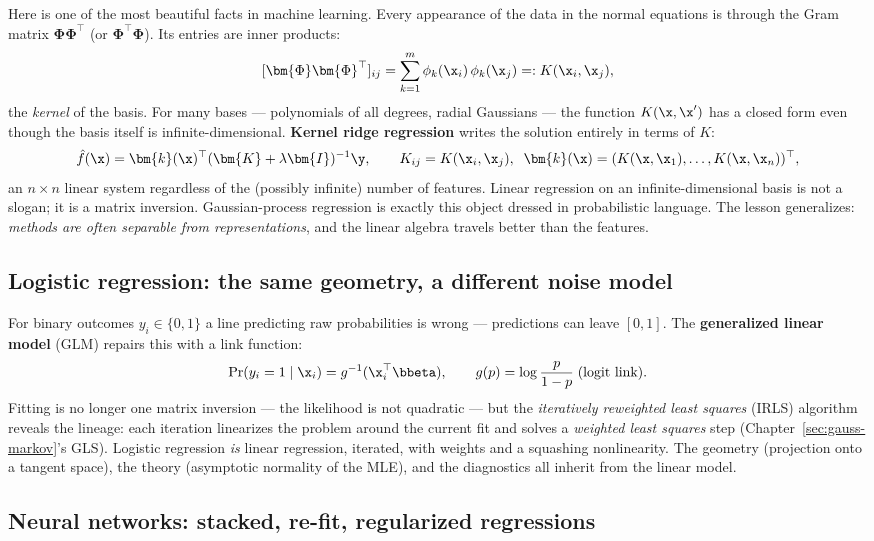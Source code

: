 Here is one of the most beautiful facts in machine learning. Every appearance of the data in the normal equations is through the Gram matrix $\bm{\Phi}\bm{\Phi}^\top$ (or $\bm{\Phi}^\top\bm{\Phi}$). Its entries are inner products:
\[
  [\bm{\Phi}\bm{\Phi}^\top]_{ij} = \sum_{k=1}^m \phi_k(\x_i)\, \phi_k(\x_j) =: K(\x_i, \x_j),
\]
the \emph{kernel} of the basis. For many bases — polynomials of all degrees, radial Gaussians — the function $K(\x, \x')$ has a closed form even though the basis itself is infinite-dimensional. \textbf{Kernel ridge regression} writes the solution entirely in terms of $K$:
\[
  \hat{f}(\x) = \bm{k}(\x)^\top (\bm{K} + \lambda \bm{I})^{-1} \y,
  \qquad
  K_{ij} = K(\x_i, \x_j), \;\; \bm{k}(\x) = (K(\x, \x_1), \dots, K(\x, \x_n))^\top,
\]
an $n \times n$ linear system regardless of the (possibly infinite) number of features. Linear regression on an infinite-dimensional basis is not a slogan; it is a matrix inversion. Gaussian-process regression is exactly this object dressed in probabilistic language. The lesson generalizes: \emph{methods are often separable from representations}, and the linear algebra travels better than the features.

\subsection{Logistic regression: the same geometry, a different noise model}

For binary outcomes $y_i \in \{0, 1\}$ a line predicting raw probabilities is wrong — predictions can leave $[0,1]$. The \textbf{generalized linear model} (GLM) repairs this with a link function:
\[
  \Pr(y_i = 1 \mid \x_i) = g^{-1}(\x_i^\top \bbeta), \qquad g(p) = \log \frac{p}{1-p} \;(\text{logit link}).
\]
Fitting is no longer one matrix inversion — the likelihood is not quadratic — but the \emph{iteratively reweighted least squares} (IRLS) algorithm reveals the lineage: each iteration linearizes the problem around the current fit and solves a \emph{weighted least squares} step (Chapter~\ref{sec:gauss-markov}'s GLS). Logistic regression \emph{is} linear regression, iterated, with weights and a squashing nonlinearity. The geometry (projection onto a tangent space), the theory (asymptotic normality of the MLE), and the diagnostics all inherit from the linear model.

\subsection{Neural networks: stacked, re-fit, regularized regressions}

